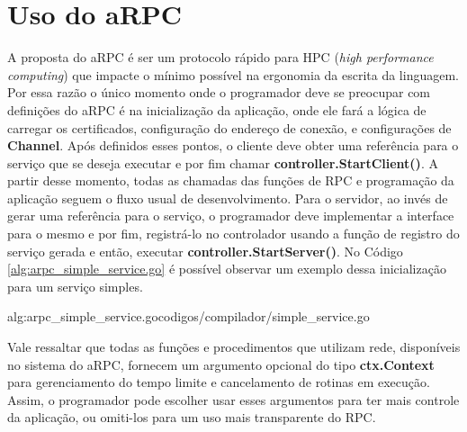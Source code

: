 \section{Uso do aRPC}

A proposta do aRPC é ser um protocolo rápido para HPC (\textit{high performance computing}) que impacte o mínimo possível na ergonomia da escrita da linguagem. Por essa razão o único momento onde o programador deve se preocupar com definições do aRPC é na inicialização da aplicação, onde ele fará a lógica de carregar os certificados, configuração do endereço de conexão, e configurações de \textbf{Channel}. Após definidos esses pontos, o cliente deve obter uma referência para o serviço que se deseja executar e por fim chamar \textbf{controller.StartClient()}. A partir desse momento, todas as chamadas das funções de RPC e programação da aplicação seguem o fluxo usual de desenvolvimento. Para o servidor, ao invés de gerar uma referência para o serviço, o programador deve implementar a interface para o mesmo e por fim, registrá-lo no controlador usando a função de registro do serviço gerada e então, executar \textbf{controller.StartServer()}. No Código \ref{alg:arpc_simple_service.go} é possível observar um exemplo dessa inicialização para um serviço simples. 

 {alg:arpc_simple_service.go}{codigos/compilador/simple_service.go}{}


Vale ressaltar que todas as funções e procedimentos que utilizam rede, disponíveis no sistema do aRPC, fornecem um argumento opcional do tipo \textbf{ctx.Context} para gerenciamento do tempo limite e cancelamento de rotinas em execução. Assim, o programador pode escolher usar esses argumentos para ter mais controle da aplicação, ou omiti-los para um uso mais transparente do RPC.
